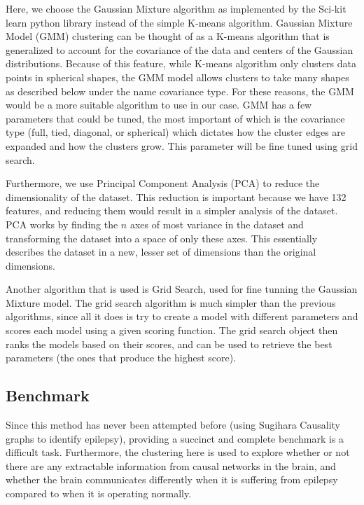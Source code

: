 \documentclass[journal,12pt,onecolumn,draftclsnofoot]{IEEEtran}  %
\begin{document}
Here, we choose the Gaussian Mixture algorithm as implemented by the Sci-kit learn python library instead of the simple K-means algorithm. Gaussian Mixture Model (GMM) clustering can be thought of as a K-means algorithm that is generalized to account for the covariance of the data and centers of the Gaussian distributions. Because of this feature, while K-means algorithm only clusters data points in spherical shapes, the GMM model allows clusters to take many shapes as described below under the name covariance type. For these reasons, the GMM would be a more suitable algorithm to use in our case. GMM has a few parameters that could be tuned, the most important of which is the covariance type (full, tied, diagonal, or spherical) which dictates how the cluster edges are expanded and how the clusters grow. This parameter will be fine tuned using grid search. 

Furthermore, we use Principal Component Analysis (PCA) to reduce the dimensionality of the dataset. This reduction is important because we have 132 features, and reducing them would result in a simpler analysis of the dataset. PCA works by finding the $n$ axes of most variance in the dataset and transforming the dataset into a space of only these axes. This essentially describes the dataset in a new, lesser set of dimensions than the original dimensions.

Another algorithm that is used is Grid Search, used for fine tunning the Gaussian Mixture model. The grid search algorithm is much simpler than the previous algorithms, since all it does is try to create a model with different parameters and scores each model using a given scoring function. The grid search object then ranks the models based on their scores, and can be used to retrieve the best parameters (the ones that produce the highest score).

\subsection{Benchmark}
\label{sec:benchmark}
Since this method has never been attempted before (using Sugihara Causality graphs to identify epilepsy), providing a succinct and complete benchmark is a difficult task. Furthermore, the clustering here is used to explore whether or not there are any extractable information from causal networks in the brain, and whether the brain communicates differently when it is suffering from epilepsy compared to when it is operating normally. 
\end{document}
